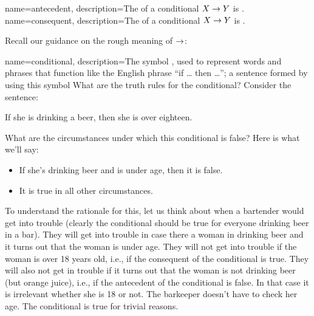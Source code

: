 {
	name=antecedent,
	description={The   of a conditional $X\rightarrow Y$ is \metaX.}
}
{
	name=consequent,
	description={The   of a conditional $X\rightarrow Y$ is \metaY.}
}

Recall our guidance on the rough meaning of $\rightarrow$:





{
name=conditional,
description={The symbol \eif, used to represent words and phrases that function like the English phrase ``if \ldots{} then \ldots''; a sentence formed by using this symbol}
}
What are the truth rules for the conditional? Consider the sentence:
\begin{earg}
\item[\ex{bartender}] If she is drinking a beer, then she is over eighteen.
\end{earg}
What are the circumstances under which this conditional is false?
Here is what we'll say:
\begin{itemize}
\item If she's drinking beer and is under age, then it is false.
\item It is true in all other circumstances.
\end{itemize}
To understand the rationale for this, let us think about when a bartender would get into trouble (clearly the conditional should be true for everyone drinking beer in a bar). They will get into trouble in case there a woman in drinking beer and it turns out that the woman is under age. They will not get into trouble if the woman is over 18 years old, i.e., if the consequent of the conditional is true. They will also not get in trouble if it turns out that the woman is not drinking beer (but orange juice), i.e., if the antecedent of the conditional is false.  In that case it is irrelevant whether she is 18 or not. The barkeeper doesn't have to check her age. The conditional is true for trivial reasons.


